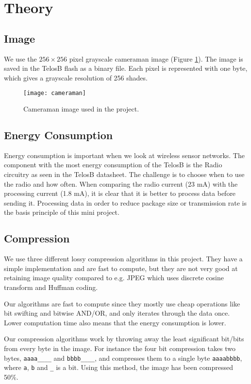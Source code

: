 \section{Theory}

\subsection{Image}
We use the $256 \times 256$ pixel grayscale cameraman image (Figure \ref{fig:image_cameraman}). 
The image is saved in the TelosB flash as a binary file. Each pixel is represented with one byte, which gives a grayscale resolution of 256 shades.

\begin{figure}[ht!]
\centering
\texttt{[image: cameraman]}
\caption{Cameraman image used in the project.}
\label{fig:image_cameraman}
\end{figure}

\subsection{Energy Consumption}
Energy consumption is important when we look at wireless sensor networks. The component with the most energy consumption of the TelosB is the Radio circuitry as seen in the TelosB datasheet. The challenge is to choose when to use the radio and how often. When comparing the radio current (23 mA) with the processing current (1.8 mA), it is clear that it is better to process data before sending it. Processing data in order to reduce package size or transmission rate is the basis principle of this mini project. 

\subsection{Compression}

We use three different lossy compression algorithms in this project.
They have a simple implementation and are fast to compute, but they are not very good at retaining image quality compared to e.g. JPEG which uses discrete cosine transform and Huffman coding.

Our algorithms are fast to compute since they mostly use cheap operations like bit swifting and bitwise AND/OR, and only iterates through the data once.
Lower computation time also means that the energy consumption is lower.

Our compression algorithms work by throwing away the least significant bit/bits from every byte in the image.
For instance the four bit compression takes two bytes, \texttt{aaaa\_\_\_\_} and \texttt{bbbb\_\_\_\_}, and compresses them to a single byte \texttt{aaaabbbb}, where \texttt{a}, \texttt{b} and \texttt{\_} is a bit. Using this method, the image has been compressed 50\%.


